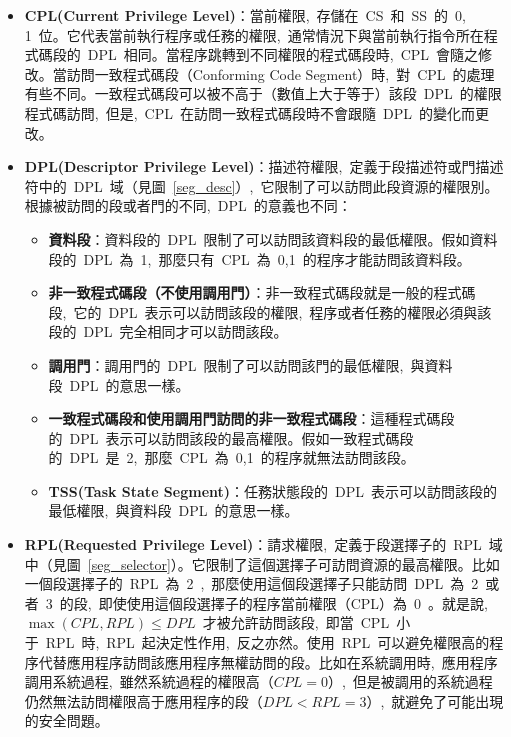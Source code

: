 \begin{itemize}
\item{\textbf{CPL(Current Privilege Level)}}：當前權限,~存儲在~CS~和~SS~的~0, 1~位。它代表當前執行程序或任務的權限,~通常情況下與當前執行指令所在程式碼段的~DPL~相同。當程序跳轉到不同權限的程式碼段時,~CPL~會隨之修改。當訪問一致程式碼段（Conforming Code Segment）時,~對~CPL~的處理有些不同。一致程式碼段可以被不高于（數值上大于等于）該段~DPL~的權限程式碼訪問,~但是,~CPL~在訪問一致程式碼段時不會跟隨~DPL~的變化而更改。

\item{\textbf{DPL(Descriptor Privilege Level)}}：描述符權限,~定義于段描述符或門描述符中的~DPL~域（見圖~\ref{seg_desc}）,~它限制了可以訪問此段資源的權限別。根據被訪問的段或者門的不同,~DPL~的意義也不同：
  \begin{itemize}
  \item{\textbf{資料段}}：資料段的~DPL~限制了可以訪問該資料段的最低權限。假如資料段的~DPL~為~1,~那麼只有~CPL~為~0,1~的程序才能訪問該資料段。
  \item{\textbf{非一致程式碼段（不使用調用門）}}：非一致程式碼段就是一般的程式碼段,~它的~DPL~表示可以訪問該段的權限,~程序或者任務的權限必須與該段的~DPL~完全相同才可以訪問該段。
  \item{\textbf{調用門}}：調用門的~DPL~限制了可以訪問該門的最低權限,~與資料段~DPL~的意思一樣。
  \item{\textbf{一致程式碼段和使用調用門訪問的非一致程式碼段}}：這種程式碼段的~DPL~表示可以訪問該段的最高權限。假如一致程式碼段的~DPL~是~2,~那麼~CPL~為~0,1~的程序就無法訪問該段。
  \item{\textbf{TSS(Task State Segment)}}：任務狀態段的~DPL~表示可以訪問該段的最低權限,~與資料段~DPL~的意思一樣。
  \end{itemize}

\item{\textbf{RPL(Requested Privilege Level)}}：請求權限,~定義于段選擇子的~RPL~域中（見圖~\ref{seg_selector}）。它限制了這個選擇子可訪問資源的最高權限。比如一個段選擇子的~RPL~為~2~,~那麼使用這個段選擇子只能訪問~DPL~為~2~或者~3~的段,~即使使用這個段選擇子的程序當前權限（CPL）為~0~。就是說,~$\max{(CPL, RPL)}\le DPL$~才被允許訪問該段,~即當~CPL~小于~RPL~時,~RPL~起決定性作用,~反之亦然。使用~RPL~可以避免權限高的程序代替應用程序訪問該應用程序無權訪問的段。比如在系統調用時,~應用程序調用系統過程,~雖然系統過程的權限高（$CPL=0$）,~但是被調用的系統過程仍然無法訪問權限高于應用程序的段（$DPL<RPL=3$）,~就避免了可能出現的安全問題。
\end{itemize}

